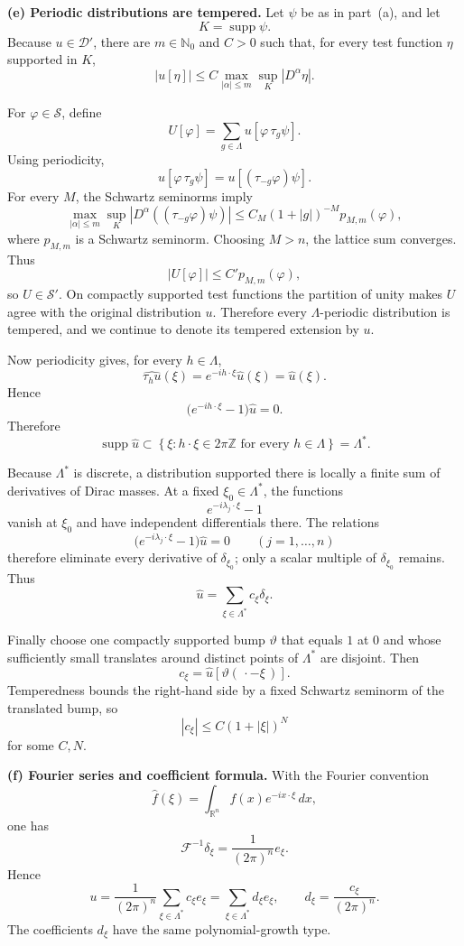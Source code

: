 \begin{solution}
\par\smallskip\noindent\textbf{(e) Periodic distributions are tempered.}
Let \(\psi\) be as in part~(a), and let
\[
K=\operatorname{supp}\psi.
\]
Because \(u\in\mathcal D'\), there are \(m\in\mathbb N_0\) and \(C>0\)
such that, for every test function \(\eta\) supported in \(K\),
\[
|u[\eta]|
\le
C
\max_{|\alpha|\le m}
\sup_K |D^\alpha\eta|.
\]

For \(\varphi\in\mathcal S\), define
\[
U[\varphi]
=
\sum_{g\in\Lambda}
u[\varphi\,\tau_g\psi].
\]
Using periodicity,
\[
u[\varphi\,\tau_g\psi]
=
u[(\tau_{-g}\varphi)\psi].
\]
For every \(M\), the Schwartz seminorms imply
\[
\max_{|\alpha|\le m}
\sup_K
|D^\alpha((\tau_{-g}\varphi)\psi)|
\le
C_M
(1+|g|)^{-M}
p_{M,m}(\varphi),
\]
where \(p_{M,m}\) is a Schwartz seminorm. Choosing \(M>n\), the lattice
sum converges. Thus
\[
|U[\varphi]|
\le
C'
p_{M,m}(\varphi),
\]
so \(U\in\mathcal S'\). On compactly supported test functions the
partition of unity makes \(U\) agree with the original distribution
\(u\). Therefore every \(\Lambda\)-periodic distribution is tempered,
and we continue to denote its tempered extension by \(u\).

Now periodicity gives, for every \(h\in\Lambda\),
\[
\widehat{\tau_hu}(\xi)
=
e^{-ih\cdot\xi}\widehat u(\xi)
=
\widehat u(\xi).
\]
Hence
\[
\bigl(e^{-ih\cdot\xi}-1\bigr)\widehat u=0.
\]
Therefore
\[
\operatorname{supp}\widehat u
\subset
\left\{
\xi:
h\cdot\xi\in2\pi\mathbb Z
\text{ for every }h\in\Lambda
\right\}
=
\Lambda^*.
\]

Because \(\Lambda^*\) is discrete, a distribution supported there is
locally a finite sum of derivatives of Dirac masses. At a fixed
\(\xi_0\in\Lambda^*\), the functions
\[
e^{-i\lambda_j\cdot\xi}-1
\]
vanish at \(\xi_0\) and have independent differentials there. The
relations
\[
\bigl(e^{-i\lambda_j\cdot\xi}-1\bigr)\widehat u=0
\qquad(j=1,\dots,n)
\]
therefore eliminate every derivative of \(\delta_{\xi_0}\); only a
scalar multiple of \(\delta_{\xi_0}\) remains. Thus
\[
\widehat u
=
\sum_{\xi\in\Lambda^*}
c_\xi\delta_\xi.
\]

Finally choose one compactly supported bump \(\vartheta\) that equals
\(1\) at \(0\) and whose sufficiently small translates around distinct
points of \(\Lambda^*\) are disjoint. Then
\[
c_\xi
=
\widehat u[\vartheta(\,\cdot-\xi\,)].
\]
Temperedness bounds the right-hand side by a fixed Schwartz seminorm of
the translated bump, so
\[
\boxed{
|c_\xi|
\le
C(1+|\xi|)^N
}
\]
for some \(C,N\).

\par\smallskip\noindent\textbf{(f) Fourier series and coefficient formula.}
With the Fourier convention
\[
\widehat f(\xi)
=
\int_{\mathbb R^n}
f(x)e^{-ix\cdot\xi}\,dx,
\]
one has
\[
\mathcal F^{-1}\delta_\xi
=
\frac1{(2\pi)^n}e_\xi.
\]
Hence
\[
u
=
\frac1{(2\pi)^n}
\sum_{\xi\in\Lambda^*}
c_\xi e_\xi
=
\sum_{\xi\in\Lambda^*}
d_\xi e_\xi,
\qquad
d_\xi
=
\frac{c_\xi}{(2\pi)^n}.
\]
The coefficients \(d_\xi\) have the same polynomial-growth type.


\end{solution}
